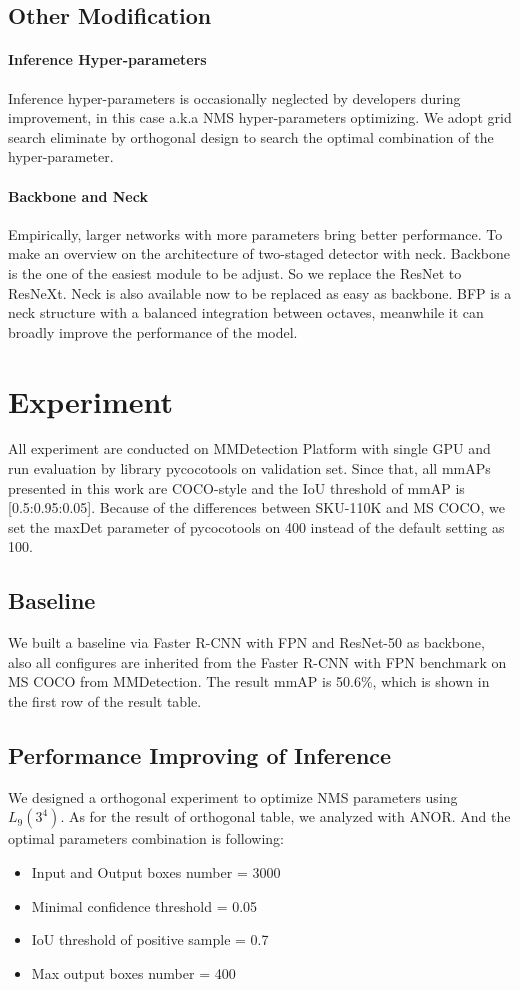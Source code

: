 \documentclass{article}
\begin{document}
\subsection{Other Modification}
\paragraph{Inference Hyper-parameters} Inference hyper-parameters is occasionally neglected by developers during improvement, in this case a.k.a NMS hyper-parameters optimizing. We adopt grid search eliminate by orthogonal design to search the optimal combination of the hyper-parameter.
\paragraph{Backbone and Neck} Empirically, larger networks with more parameters bring better performance. To make an overview on the architecture of two-staged detector with neck. Backbone is the one of the easiest module to be adjust. So we replace the ResNet to ResNeXt\cite{resnext}. Neck is also available now to be replaced as easy as backbone. BFP\cite{bfp} is a neck structure with a balanced integration between octaves, meanwhile it can broadly improve the performance of the model. 

\section{Experiment}
All experiment are conducted on MMDetection Platform with single GPU and run evaluation by library pycocotools on validation set. Since that, all mmAPs presented in this work are COCO-style and the IoU threshold of mmAP is [0.5:0.95:0.05]. Because of the differences between SKU-110K and MS COCO, we set the maxDet parameter of pycocotools on 400 instead of the default setting as 100.
\subsection{Baseline}
We built a baseline via Faster R-CNN\cite{faster} with FPN\cite{fpn} and ResNet-50\cite{resnet} as backbone, also all configures are inherited from the Faster R-CNN with FPN benchmark on MS COCO from MMDetection\cite{mmdet}. The result mmAP is 50.6\%, which is shown in the first row of the result table.
\subsection{Performance Improving of Inference}
We designed a orthogonal experiment to optimize NMS parameters using $L_9(3^4)$. As for the result of orthogonal table, we analyzed with ANOR. And the optimal parameters combination is following:
\begin{itemize}
    \item Input and Output boxes number = 3000
    \item Minimal confidence threshold = 0.05
    \item IoU threshold of positive sample = 0.7
    \item Max output boxes number = 400
\end{itemize}
\end{document}
